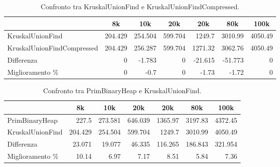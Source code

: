 \begin{table}[H]
\centering
    \hspace*{-0.25cm}
    \begin{tabular}{|l|rrrrrr|}
    \hline
    &  \multicolumn{1}{c}{8k} & \multicolumn{1}{c}{10k} & \multicolumn{1}{c}{20k} & \multicolumn{1}{c}{20k} & \multicolumn{1}{c}{80k} &           \multicolumn{1}{c|}{100k} \\
    \hline
     KruskalUnionFind           & 204.429 & 254.504 & 599.704 & 1249.7   & 3010.99  & 4050.49 \\
     KruskalUnionFindCompressed & 204.429 & 256.287 & 599.704 & 1271.32  & 3062.76  & 4050.49 \\ \hline
     Differenza                 &   0     &  -1.783 &   0     &  -21.615 &  -51.773 &    0    \\
     Miglioramento \%              &   0     &  -0.7   &   0     &   -1.73  &   -1.72  &    0    \\
    \hline
    \end{tabular}
    \caption{Confronto tra KruskalUnionFind e KruskalUnionFindCompressed.}
    \label{table:kruskal-union-find-vs-kruskal-union-find-compressed}
\end{table}

\begin{table}[H]
\centering
    \begin{tabular}{|l|rrrrrr|}
    \hline
    &  \multicolumn{1}{c}{8k} & \multicolumn{1}{c}{10k} & \multicolumn{1}{c}{20k} & \multicolumn{1}{c}{20k} & \multicolumn{1}{c}{80k} &           \multicolumn{1}{c|}{100k} \\
    \hline
     PrimBinaryHeap   & 227.5   & 273.581 & 646.039 & 1365.97  & 3197.83  & 4372.45  \\
     KruskalUnionFind & 204.429 & 254.504 & 599.704 & 1249.7   & 3010.99  & 4050.49 \\ \hline
     Differenza       &  23.071 &  19.077 &  46.335 &  116.265 &  186.843 &  321.954 \\
     Miglioramento \%    &  10.14  &   6.97  &   7.17  &    8.51  &    5.84  &    7.36  \\
    \hline
    \end{tabular}
    \caption{Confronto tra PrimBinaryHeap e KruskalUnionFind.}
    \label{table:prim-binary-heap-vs-kruskal-union-find}
\end{table}


